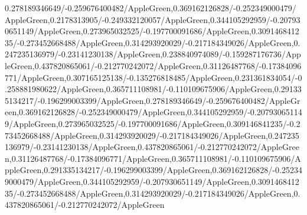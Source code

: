 {\begin{tikzternal}
{0.278189346649/-0.259676400482/AppleGreen,0.369162126828/-0.252349000479/AppleGreen,0.2178313905/-0.249332120057/AppleGreen,0.344105292959/-0.207930651149/AppleGreen,0.273965032525/-0.197700091686/AppleGreen,0.309146841235/-0.273452668488/AppleGreen,0.314293920029/-0.217184349026/AppleGreen,0.247235136979/-0.23141230138/AppleGreen,0.238840974089/-0.159287176736/AppleGreen,0.437820865061/-0.212770242072/AppleGreen,0.31126487768/-0.17384096771/AppleGreen,0.307165125138/-0.135276818485/AppleGreen,0.231361834054/-0.258881980622/AppleGreen,0.365711108981/-0.110109675906/AppleGreen,0.291335134217/-0.196299003399/AppleGreen,0.278189346649/-0.259676400482/AppleGreen,0.369162126828/-0.252349000479/AppleGreen,0.344105292959/-0.207930651149/AppleGreen,0.273965032525/-0.197700091686/AppleGreen,0.309146841235/-0.273452668488/AppleGreen,0.314293920029/-0.217184349026/AppleGreen,0.247235136979/-0.23141230138/AppleGreen,0.437820865061/-0.212770242072/AppleGreen,0.31126487768/-0.17384096771/AppleGreen,0.365711108981/-0.110109675906/AppleGreen,0.291335134217/-0.196299003399/AppleGreen,0.369162126828/-0.252349000479/AppleGreen,0.344105292959/-0.207930651149/AppleGreen,0.309146841235/-0.273452668488/AppleGreen,0.314293920029/-0.217184349026/AppleGreen,0.437820865061/-0.212770242072/AppleGreen} {
 \DATACIRCLE[\c]{(\x,\y)}
}\end{tikzternal}}